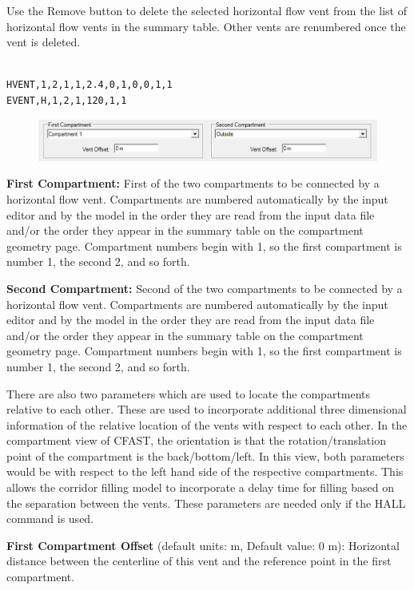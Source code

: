 Use the Remove button to delete the selected horizontal flow vent from the list of horizontal flow vents in the summary table.  Other vents are renumbered once the vent is deleted. \\~ \\

\begin{lstlisting}
HVENT,1,2,1,1,2.4,0,1,0,0,1,1
EVENT,H,1,2,1,120,1,1
\end{lstlisting}

\begin{figure}[h!]
\includegraphics[width=6.5in]{FIGURES/Input_File/Compartment_From_To}
\end{figure}

\textbf{First Compartment:} First of the two compartments to be connected by a horizontal flow vent.  Compartments are numbered automatically by the input editor and by the model in the order they are read from the input data file and/or the order they appear in the summary table on the compartment geometry page. Compartment numbers begin with 1, so the first compartment is number 1, the second 2, and so forth.

\textbf{Second Compartment:} Second of the two compartments to be connected by a horizontal flow vent.  Compartments are numbered automatically by the input editor and by the model in the order they are read from the input data file and/or the order they appear in the summary table on the compartment geometry page. Compartment numbers begin with 1, so the first compartment is number 1, the second 2, and so forth.

There are also two parameters which are used to locate the compartments relative to each other. These are used to incorporate additional three dimensional information of the relative location of the vents with respect to each other. In the compartment view of CFAST, the orientation is that the rotation/translation point of the compartment is the back/bottom/left. In this view, both parameters would be with respect to the left hand side of the respective compartments. This allows the corridor filling model to incorporate a delay time for filling based on the separation between the vents. These parameters are needed only if the HALL command is used. 

\textbf{First Compartment Offset} (default units: m, Default value: 0 m): Horizontal distance between the centerline of this vent and the reference point in the first compartment.

